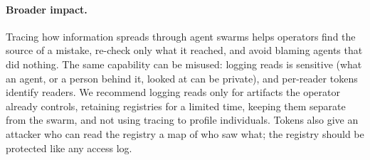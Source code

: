 \paragraph{Broader impact.}
Tracing how information spreads through agent swarms helps operators find the source of a mistake, re-check only what it reached, and avoid blaming agents that did nothing. The same capability can be misused: logging reads is sensitive (what an agent, or a person behind it, looked at can be private), and per-reader tokens identify readers. We recommend logging reads only for artifacts the operator already controls, retaining registries for a limited time, keeping them separate from the swarm, and not using tracing to profile individuals. Tokens also give an attacker who can read the registry a map of who saw what; the registry should be protected like any access log.
